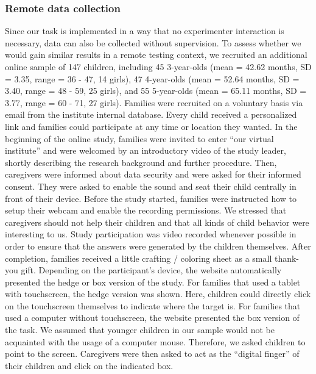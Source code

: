 \documentclass[
  man,floatsintext]{apa6}
\begin{document}
\hypertarget{remote-data-collection}{%
\subsubsection{Remote data collection}\label{remote-data-collection}}

Since our task is implemented in a way that no experimenter interaction is necessary, data can also be collected without supervision.
To assess whether we would gain similar results in a remote testing context, we recruited an additional online sample of 147 children, including
45 3-year-olds
(mean = 42.62 months,
SD = 3.35,
range = 36
- 47,
14 girls),
47 4-year-olds
(mean = 52.64 months,
SD = 3.40,
range = 48
- 59,
25 girls),
and 55 5-year-olds
(mean = 65.11 months,
SD = 3.77,
range = 60
- 71,
27 girls).
Families were recruited on a voluntary basis via email from the institute internal database. Every child received a personalized link and families could participate at any time or location they wanted.
In the beginning of the online study, families were invited to enter ``our virtual institute'' and were welcomed by an introductory video of the study leader, shortly describing the research background and further procedure. Then, caregivers were informed about data security and were asked for their informed consent. They were asked to enable the sound and seat their child centrally in front of their device. Before the study started, families were instructed how to setup their webcam and enable the recording permissions. We stressed that caregivers should not help their children and that all kinds of child behavior were interesting to us. Study participation was video recorded whenever possible in order to ensure that the answers were generated by the children themselves. After completion, families received a little crafting / coloring sheet as a small thank-you gift.
Depending on the participant's device, the website automatically presented the hedge or box version of the study. For families that used a tablet with touchscreen, the hedge version was shown. Here, children could directly click on the touchscreen themselves to indicate where the target is. For families that used a computer without touchscreen, the website presented the box version of the task. We assumed that younger children in our sample would not be acquainted with the usage of a computer mouse. Therefore, we asked children to point to the screen. Caregivers were then asked to act as the ``digital finger'' of their children and click on the indicated box.
\end{document}
